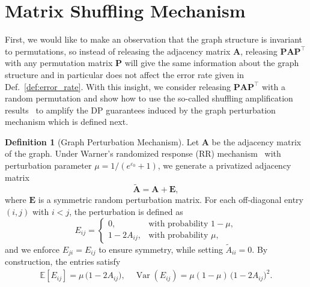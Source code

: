 \documentclass[11pt]{article}
\theoremstyle{plain}
\theoremstyle{definition}
\newtheorem{definition}{Definition}
\theoremstyle{remark}
\begin{document}


\section{Matrix Shuffling Mechanism} \label{sec:shuffling}

First, we would like to make an observation that the graph structure is invariant to permutations, so instead of releasing the adjacency matrix $\mathbf{A}$, releasing $\mathbf{P} \mathbf{A} \mathbf{P}^{\top}$ with any permutation matrix $\mathbf{P}$ will give the same information about the graph structure and in particular does not affect the error rate given in Def.~\ref{def:error_rate}. With this insight, we consider releasing $\mathbf{P} \mathbf{A} \mathbf{P}^{\top}$ with a random permutation and show how to use the so-called shuffling amplification results~\citep{feldman2022hiding} to amplify the DP guarantees induced by the graph perturbation mechanism which is defined next. \\

\begin{definition}[Graph Perturbation Mechanism]

Let $\mathbf{A}$ be the adjacency matrix of the graph.  
Under Warner's randomized response (RR) mechanism~\citep{warner1965randomized} with perturbation parameter 
$\mu = 1/(e^{\varepsilon_{0}}+1)$, we generate a privatized adjacency matrix
\begin{equation}
    \widetilde{\mathbf{A}} = \mathbf{A} + \mathbf{E},
\end{equation}
where $\mathbf{E}$ is a symmetric random perturbation matrix.  
For each off-diagonal entry $(i,j)$ with $i<j$, the perturbation is defined as
\begin{equation} \label{eq:E_def}
E_{ij} =
\begin{cases}
    0, & \text{with probability } 1-\mu, \\
    1 - 2A_{ij}, & \text{with probability } \mu,
\end{cases}
\end{equation}
and we enforce $E_{ji} = E_{ij}$ to ensure symmetry, while setting $\widetilde{A}_{ii} = 0$.  
By construction, the entries satisfy
\begin{equation*}
\begin{aligned}
\mathbb{E}[E_{ij}] = \mu \,\bigl(1 - 2A_{ij}\bigr), \quad
\operatorname{Var}(E_{ij}) = \mu(1-\mu)\,\bigl(1 - 2A_{ij}\bigr)^2. \nonumber
\end{aligned}
\end{equation*}
\end{definition}
\end{document}

